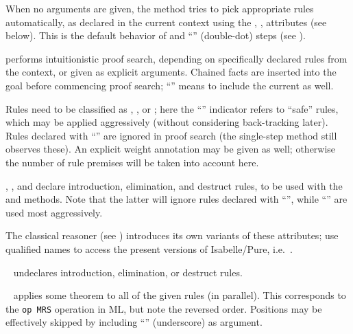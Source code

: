 \begin{isabellebody}
\begin{isamarkuptext}
\begin{descr}
  When no arguments are given, the \mbox{} method tries to pick
  appropriate rules automatically, as declared in the current context
  using the \mbox{}, \mbox{}, \mbox{}
  attributes (see below).  This is the default behavior of \mbox{} and ``\mbox{\isa{\isacommand{{\isachardot}{\isachardot}}}}'' (double-dot) steps (see
  ).
  
  \item [\mbox{\isa{iprover}}] performs intuitionistic proof search,
  depending on specifically declared rules from the context, or given
  as explicit arguments.  Chained facts are inserted into the goal
  before commencing proof search; ``\mbox{}\isa{{\isacharbang}}'' 
  means to include the current \mbox{} as well.
  
  Rules need to be classified as \mbox{}, \mbox{}, or \mbox{}; here the ``\isa{{\isacharbang}}'' indicator
  refers to ``safe'' rules, which may be applied aggressively (without
  considering back-tracking later).  Rules declared with ``\isa{{\isacharquery}}'' are ignored in proof search (the single-step \mbox{}
  method still observes these).  An explicit weight annotation may be
  given as well; otherwise the number of rule premises will be taken
  into account here.
  
  \item [\mbox{\isa{intro}}, \mbox{\isa{elim}}, and \mbox{\isa{dest}}]
  declare introduction, elimination, and destruct rules, to be used
  with the \mbox{} and \mbox{} methods.  Note that
  the latter will ignore rules declared with ``\isa{{\isacharquery}}'', while
  ``\isa{{\isacharbang}}''  are used most aggressively.
  
  The classical reasoner (see ) introduces its
  own variants of these attributes; use qualified names to access the
  present versions of Isabelle/Pure, i.e.\ \mbox{}.
  
  \item [\mbox{\isa{rule}}~\isa{del}] undeclares introduction,
  elimination, or destruct rules.
  
  \item [\mbox{\isa{OF}}~\isa{a\isactrlsub {\isadigit{1}}\ {\isasymdots}\ a\isactrlsub n}] applies some
  theorem to all of the given rules 
  (in parallel).  This corresponds to the \verb|op MRS| operation in
  ML, but note the reversed order.  Positions may be effectively
  skipped by including ``\isa{{\isacharunderscore}}'' (underscore) as argument.
  

\end{descr}
\end{isamarkuptext}
\end{isabellebody}
